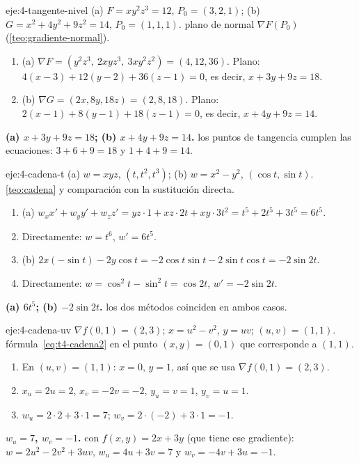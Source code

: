 \begin{solucion}{eje:4-tangente-nivel}
\datos (a) $F=xy^2z^3=12$, $P_0=(3,2,1)$; (b) $G=x^2+4y^2+9z^2=14$, $P_0=(1,1,1)$.
\planteamiento plano de normal $\nabla F(P_0)$ (\cref{teo:gradiente-normal}).
\pasos
\begin{enumerate}[label=\arabic*.]
  \item (a) $\nabla F=(y^2z^3,\ 2xyz^3,\ 3xy^2z^2)=(4,12,36)$. Plano: $4(x-3)+12(y-2)+36(z-1)=0$, es decir, $x+3y+9z=18$.
  \item (b) $\nabla G=(2x,8y,18z)=(2,8,18)$. Plano: $2(x-1)+8(y-1)+18(z-1)=0$, es decir, $x+4y+9z=14$.
\end{enumerate}
\resultado \textbf{(a) $x+3y+9z=18$; (b) $x+4y+9z=14$.}
\comprobacion los puntos de tangencia cumplen las ecuaciones: $3+6+9=18$ y $1+4+9=14$.
\end{solucion}

\begin{solucion}{eje:4-cadena-t}
\datos (a) $w=xyz$, $(t,t^2,t^3)$; (b) $w=x^2-y^2$, $(\cos t,\sin t)$.
\planteamiento \cref{teo:cadena} y comparación con la sustitución directa.
\pasos
\begin{enumerate}[label=\arabic*.]
  \item (a) $w_xx'+w_yy'+w_zz'=yz\cdot1+xz\cdot2t+xy\cdot3t^2=t^5+2t^5+3t^5=6t^5$.
  \item Directamente: $w=t^6$, $w'=6t^5$.
  \item (b) $2x(-\sin t)-2y\cos t=-2\cos t\sin t-2\sin t\cos t=-2\sin2t$.
  \item Directamente: $w=\cos^2t-\sin^2t=\cos2t$, $w'=-2\sin2t$.
\end{enumerate}
\resultado \textbf{(a) $6t^5$; (b) $-2\sin2t$.}
\comprobacion los dos métodos coinciden en ambos casos.
\end{solucion}

\begin{solucion}{eje:4-cadena-uv}
\datos $\nabla f(0,1)=(2,3)$; $x=u^2-v^2$, $y=uv$; $(u,v)=(1,1)$.
\planteamiento fórmula~\eqref{eq:t4-cadena2} en el punto $(x,y)=(0,1)$ que corresponde a $(1,1)$.
\pasos
\begin{enumerate}[label=\arabic*.]
  \item En $(u,v)=(1,1)$: $x=0$, $y=1$, así que se usa $\nabla f(0,1)=(2,3)$.
  \item $x_u=2u=2$, $x_v=-2v=-2$, $y_u=v=1$, $y_v=u=1$.
  \item $w_u=2\cdot2+3\cdot1=7$; $w_v=2\cdot(-2)+3\cdot1=-1$.
\end{enumerate}
\resultado \textbf{$w_u=7$, $w_v=-1$.}
\comprobacion con $f(x,y)=2x+3y$ (que tiene ese gradiente): $w=2u^2-2v^2+3uv$, $w_u=4u+3v=7$ y $w_v=-4v+3u=-1$.
\end{solucion}

